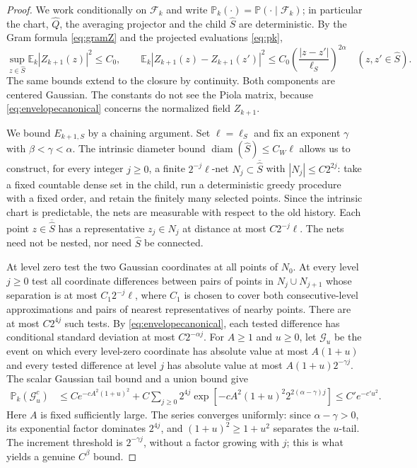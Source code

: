 \documentclass[11pt]{article}
\theoremstyle{definition}
\theoremstyle{remark}
\numberwithin{equation}{section}
\newcommand{\E}{\mathbb E}
\newcommand{\Pp}{\mathbb P}
\newcommand{\F}{\mathcal F}
\begin{document}
\begin{proof}
We work conditionally on $\F_k$ and write
$\Pp_k(\cdot)=\Pp(\cdot\mid\F_k)$; in particular the chart,
$\widehat Q$, the averaging projector and the child
$\widehat S$ are deterministic. By the Gram formula
\eqref{eq:gramZ} and the projected evaluations \eqref{eq:pk},
\begin{equation}\label{eq:envelopecanonical}
 \sup_{z\in\widehat S}\E_k|Z_{k+1}(z)|^2\le C_0,
 \qquad
 \E_k|Z_{k+1}(z)-Z_{k+1}(z')|^2
 \le C_0\left(\frac{|z-z'|}{\ell_S}\right)^{2\alpha}
 \quad(z,z'\in\widehat S).
\end{equation}
The same bounds extend to the closure by continuity. Both
components are centered Gaussian. The constants do not see the
Piola matrix, because \eqref{eq:envelopecanonical} concerns the
normalized field $Z_{k+1}$.

We bound $E_{k+1,S}$ by a chaining argument.
Set $\ell=\ell_S$ and fix an exponent
$\gamma$ with $\beta<\gamma<\alpha$. The intrinsic diameter
bound $\operatorname{diam}(\widehat S)\le C_W\ell$ allows us to
construct, for every integer $j\ge0$, a finite
$2^{-j}\ell$-net $N_j\subset\overline{\widehat S}$ with
$|N_j|\le C2^{2j}$: take a fixed countable dense set in the
child, run a deterministic greedy procedure with a fixed order,
and retain the finitely many selected points. Since the intrinsic
chart is predictable, the nets are measurable with respect to the
old history. Each point $z\in\overline{\widehat S}$ has a
representative $z_j\in N_j$ at distance at most $C2^{-j}\ell$.
The nets need not be nested, nor need $\widehat S$ be connected.

At level zero test the two Gaussian coordinates at all points of
$N_0$. At every level $j\ge0$ test all coordinate differences
between pairs of points in $N_j\cup N_{j+1}$ whose separation is
at most $C_1 2^{-j}\ell$, where $C_1$ is chosen to cover both
consecutive-level approximations and pairs of nearest
representatives of nearby points. There are at most $C2^{4j}$
such tests. By \eqref{eq:envelopecanonical}, each tested
difference has conditional standard deviation at most
$C2^{-\alpha j}$. For $A\ge1$ and $u\ge0$, let $\mathcal G_u$ be the event
on which every level-zero coordinate has absolute value at most
$A(1+u)$ and every tested difference at level $j$ has absolute
value at most $A(1+u)2^{-\gamma j}$. The scalar Gaussian tail
bound and a union bound give
\begin{align}\label{eq:chainingfailure}
 \Pp_k(\mathcal G_u^c)
 &\le Ce^{-cA^2(1+u)^2}
 +C\sum_{j\ge0}2^{4j}
  \exp\!\left[-cA^2(1+u)^2
               2^{2(\alpha-\gamma)j}\right]
 \le C'e^{-c'u^2}.
\end{align}
Here $A$ is fixed sufficiently large. The series converges
uniformly: since $\alpha-\gamma>0$, its exponential factor
dominates $2^{4j}$, and $(1+u)^2\ge1+u^2$ separates the
$u$-tail. The increment threshold is $2^{-\gamma j}$, without a
factor growing with $j$; this is what yields a genuine $C^\beta$
bound.


\end{proof}
\end{document}
